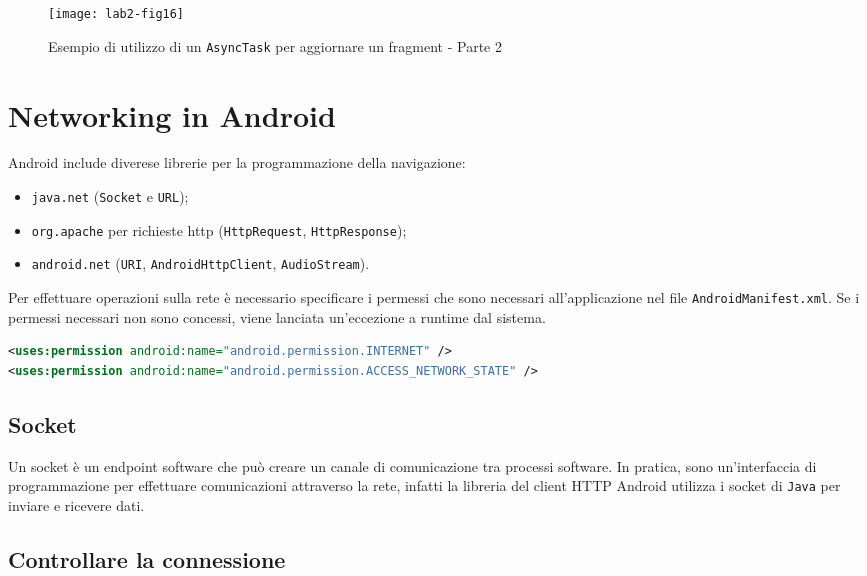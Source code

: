 \begin{figure*}[htbp]
        \centering
        \texttt{[image: lab2-fig16]}
        \caption[AsyncTask per aggiornare Fragment - 2]{Esempio di utilizzo di
un \texttt{AsyncTask} per aggiornare un fragment - Parte 2}
        \label{img:lab2-fig16}
\end{figure*}

\section{Networking in Android}

Android include diverese librerie per la programmazione della navigazione:
\begin{itemize}
\item \texttt{java.net} (\texttt{Socket} e \texttt{URL});
\item \texttt{org.apache} per richieste http (\texttt{HttpRequest},
\texttt{HttpResponse});
\item \texttt{android.net} (\texttt{URI}, \texttt{AndroidHttpClient},
\texttt{AudioStream}).
\end{itemize}

Per effettuare operazioni sulla rete è necessario specificare i permessi che
sono necessari all'applicazione nel file \texttt{AndroidManifest.xml}. Se i
permessi necessari non sono concessi, viene lanciata un'eccezione a runtime dal
sistema.

\begin{lstlisting}[language=XML, basicstyle=\footnotesize]
<uses:permission android:name="android.permission.INTERNET" />
<uses:permission android:name="android.permission.ACCESS_NETWORK_STATE" />
\end{lstlisting}

\subsection{Socket}

Un socket è un endpoint software che può creare un canale di comunicazione tra
processi software. In pratica, sono un'interfaccia di programmazione per
effettuare comunicazioni attraverso la rete, infatti la libreria del client HTTP
Android utilizza i socket di \texttt{Java} per inviare e ricevere dati.


\subsection{Controllare la connessione}

